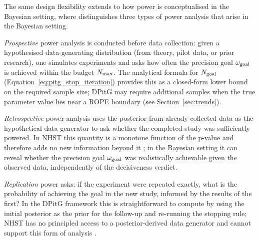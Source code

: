 The same design flexibility extends to how power is conceptualised in the Bayesian
setting, where \citet{kruschke2015doing} distinguishes three types of power analysis that arise in
the Bayesian setting.

\textit{Prospective} power analysis is conducted before data collection: given a
hypothesised data-generating distribution (from theory, pilot data, or prior research),
one simulates experiments and asks how often the precision goal $\omega_{\rm goal}$ is
achieved within the budget $N_{\rm max}$.
The analytical formula for $N_{\rm goal}$ (Equation~\ref{eq:pitg_stop_iteration})
provides this as a closed-form lower bound on the required sample size; DPitG may
require additional samples when the true parameter value lies near a ROPE boundary
(see Section~\ref{sec:trends}).

\textit{Retrospective} power analysis uses the posterior from already-collected data as
the hypothetical data generator to ask whether the completed study was sufficiently
powered. In NHST this quantity is a monotone function of the p-value and therefore adds
no new information beyond it \citep{hoenig2001}; in the Bayesian setting it can reveal
whether the precision goal $\omega_{\rm goal}$ was realistically achievable given the
observed data, independently of the decisiveness verdict.

\textit{Replication} power asks: if the experiment were repeated exactly, what is the
probability of achieving the goal in the new study, informed by the results of the
first? In the DPitG framework this is straightforward to compute by using the initial
posterior as the prior for the follow-up and re-running the stopping rule; NHST has
no principled access to a posterior-derived data generator and cannot support this
form of analysis \citep{kruschke2015doing}.
